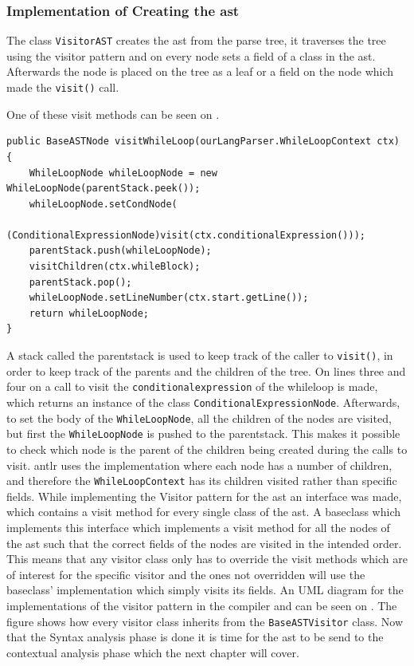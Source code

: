 \subsubsection*{Implementation of Creating the \acrshort{ast}}

The class \texttt{VisitorAST} creates the \acrshort{ast} from the parse tree, it traverses the tree using the visitor pattern and on every node sets a field of a class in the \acrshort{ast}. 
Afterwards the node is placed on the tree as a leaf or a field on the node which made the \texttt{visit()} call.

One of these visit methods can be seen on .

\begin{lstlisting}[caption=The visit method for WhileLoopNode,frame=tlrb,label={lst:VisitorASTCode}]
public BaseASTNode visitWhileLoop(ourLangParser.WhileLoopContext ctx) {
    WhileLoopNode whileLoopNode = new WhileLoopNode(parentStack.peek());
    whileLoopNode.setCondNode(
    	(ConditionalExpressionNode)visit(ctx.conditionalExpression()));
    parentStack.push(whileLoopNode);
    visitChildren(ctx.whileBlock);
    parentStack.pop();
    whileLoopNode.setLineNumber(ctx.start.getLine());
    return whileLoopNode;
}
\end{lstlisting}
A stack called the parentstack is used to keep track of the caller to \texttt{visit()}, in order to keep track of the parents and the children of the tree.
On lines three and four on  a call to visit the \texttt{conditionalexpression} of the whileloop is made, which returns an instance of the class \texttt{ConditionalExpressionNode}.
Afterwards, to set the body of the \texttt{WhileLoopNode}, all the children of the nodes are visited, but first the \texttt{WhileLoopNode} is pushed to the parentstack.
This makes it possible to check which node is the parent of the children being created during the calls to visit.
\acrshort{antlr} uses the implementation where each node has a number of children, and therefore the \texttt{WhileLoopContext} has its children visited rather than specific fields.
While implementing the Visitor pattern for the \acrshort{ast} an interface was made, which contains a visit method for every single class of the \acrshort{ast}.
A baseclass which implements this interface which implements a visit method for all the nodes of the \acrshort{ast} such that the correct fields of the nodes are visited in the intended order.
This means that any visitor class only has to override the visit methods which are of interest for the specific visitor and the ones not overridden will use the baseclass' implementation which simply visits its fields.
An UML diagram for the implementations of the visitor pattern in the compiler and can be seen on .
The figure shows how every visitor class inherits from the \texttt{BaseASTVisitor} class.
Now that the Syntax analysis phase is done it is time for the \acrshort{ast} to be send to the contextual analysis phase which the next chapter will cover.

